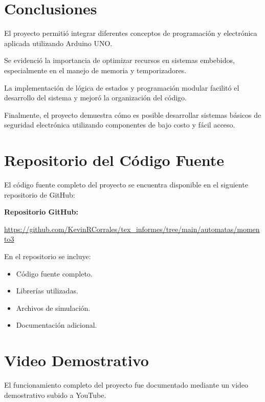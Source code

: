 \documentclass[conference]{IEEEtran}
\begin{document}
\section{Conclusiones}

El proyecto permitió integrar diferentes conceptos de programación y electrónica aplicada utilizando 
Arduino UNO.

Se evidenció la importancia de optimizar recursos en sistemas embebidos, especialmente en el manejo de 
memoria y temporizadores.

La implementación de lógica de estados y programación modular facilitó el desarrollo del sistema y 
mejoró la organización del código.

Finalmente, el proyecto demuestra cómo es posible desarrollar sistemas básicos de seguridad electrónica 
utilizando componentes de bajo costo y fácil acceso.

\section{Repositorio del Código Fuente}

El código fuente completo del proyecto se encuentra disponible en el siguiente repositorio de GitHub:

\vspace{0.3cm}

\noindent
\textbf{Repositorio GitHub:}

\url{https://github.com/KevinRCorrales/tex_informes/tree/main/automatas/momento3}

\vspace{0.3cm}

\noindent
En el repositorio se incluye:

\begin{itemize}
    \item Código fuente completo.
    \item Librerías utilizadas.
    \item Archivos de simulación.
    \item Documentación adicional.
\end{itemize}

\section{Video Demostrativo}

El funcionamiento completo del proyecto fue documentado mediante un video demostrativo subido a YouTube.
\end{document}
